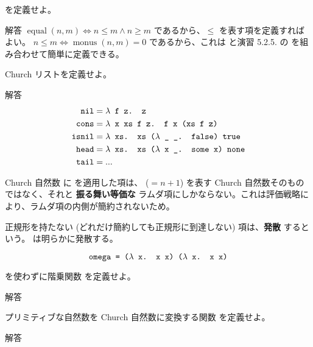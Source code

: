 \begin{jexercise*}[5.2.7]
   を定義せよ。
\end{jexercise*}
\begin{itembox}[l]{解答}
  $\operatorname{equal}(n, m) \iff n \leq m \land n \geq m$ であるから、$\leq$ を表す項を定義すればよい。
  $n \leq m \iff \operatorname{monus}(n, m) = 0$ であるから、これは  と演習 5.2.5. の  を組み合わせて簡単に定義できる。
\end{itembox}

\begin{jexercise*}[5.2.8]
  Church リストを定義せよ。
\end{jexercise*}
\begin{itembox}[l]{解答}
  \begin{align*}
    \text{\texttt{nil}}
      & = \text{\texttt{$\lambda$ f z. z}}
    \\ \text{\texttt{cons}}
      & = \text{\texttt{$\lambda$ x xs f z. f x (xs f z)}}
    \\ \text{\texttt{isnil}}
      & = \text{\texttt{$\lambda$ xs. xs ($\lambda$ \_ \_. false) true}}
    \\ \text{\texttt{head}}
      & = \text{\texttt{$\lambda$ xs. xs ($\lambda$ x \_. some x) none}}
    \\ \text{\texttt{tail}}
      & = ...
  \end{align*}
\end{itembox}

Church 自然数  に  を適用した項は、 ($= n + 1$) を表す Church 自然数そのものではなく、それと {\bf 振る舞い等価な} ラムダ項にしかならない。これは評価戦略により、ラムダ項の内側が簡約されないため。

正規形を持たない (どれだけ簡約しても正規形に到達しない) 項は、{\bf 発散} するという。 は明らかに発散する。

\[
  \text{\texttt{omega = ($\lambda$ x. x x) ($\lambda$ x. x x)}}
\]

\begin{jexercise*}[5.2.9]
   を使わずに階乗関数  を定義せよ。
\end{jexercise*}
\begin{itembox}[l]{解答}
\end{itembox}

\begin{jexercise*}[5.2.10]
  プリミティブな自然数を Church 自然数に変換する関数  を定義せよ。
\end{jexercise*}
\begin{itembox}[l]{解答}
\end{itembox}
